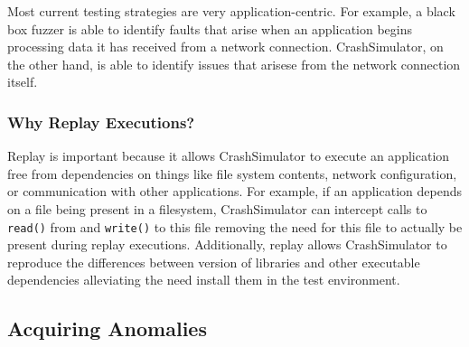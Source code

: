         Most current testing strategies are very application-centric.  For
        example, a black box fuzzer is able to identify faults that arise when
        an application begins processing data it has received from a network
        connection. CrashSimulator, on the other hand, is able to identify
        issues that arisese from the network connection itself.

    \subsubsection{Why Replay Executions?}

        Replay is important because it allows CrashSimulator to execute an
        application free from dependencies on things like file system contents,
        network configuration, or communication with other applications.  For
        example, if an application depends on a file being present in a filesystem,
        CrashSimulator can intercept calls to {\tt read()} from and {\tt write()} to
        this file removing the need for this file to actually be present during
        replay executions. Additionally, replay allows CrashSimulator to reproduce
        the differences between version of libraries and other executable
        dependencies alleviating the need install them in the test environment.



     

    \subsection{Acquiring Anomalies}
    
